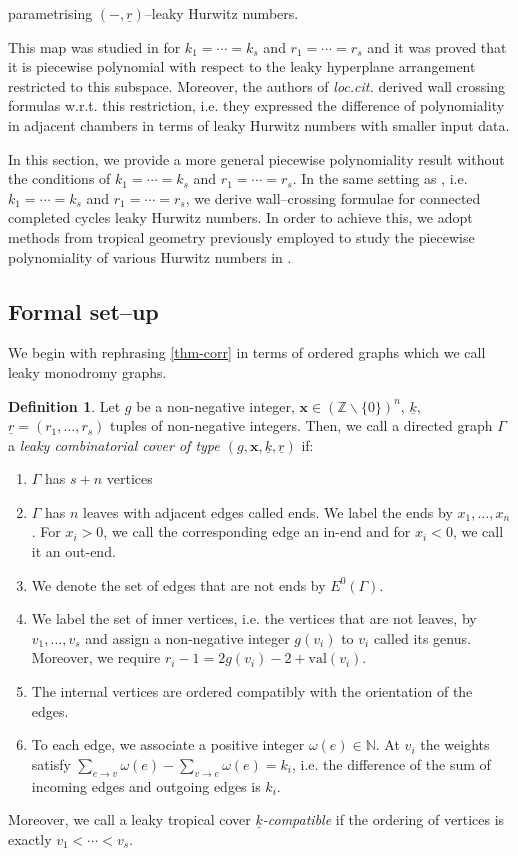 \documentclass[10pt,a4paper,oneside,no-math,reqno]{amsart}%
\theoremstyle{plain}
\theoremstyle{definition}
\newtheorem{definition}[theorem]{Definition}
\theoremstyle{remark}
\numberwithin{equation}{section}
\newcommand{\1}{\mathds{1}}
\newcommand{\<}{\langle}
\renewcommand{\>}{\rangle}
\begin{document}
parametrising $(-,\underline{r})$--leaky Hurwitz numbers.

This map was studied in \cite{AKL25} for $k_1=\cdots=k_s$ and $r_1=\cdots=r_s$ and it was proved that it is piecewise polynomial with respect to the leaky hyperplane arrangement restricted to this subspace. Moreover, the authors of \emph{loc.cit.} derived wall crossing formulas w.r.t. this restriction, i.e. they expressed the difference of polynomiality in adjacent chambers in terms of leaky Hurwitz numbers with smaller input data. 

In this section, we provide a more general piecewise polynomiality result without the conditions of $k_1=\cdots=k_s$ and $r_1=\cdots=r_s$. In the same setting as \cite{AKL25}, i.e. $k_1=\cdots=k_s$ and $r_1=\cdots=r_s$, we derive wall--crossing formulae for connected completed cycles leaky Hurwitz numbers.
In order to achieve this, we adopt methods from tropical geometry previously employed to study the piecewise polynomiality of various Hurwitz numbers in \cite{CJM11,HL20}.

\subsection{Formal set--up}
We begin with rephrasing \cref{thm-corr} in terms of ordered graphs which we call leaky monodromy graphs.

\begin{definition}
    Let $g$ be a non-negative integer, $\textbf{x}\in(\mathbb{Z}\backslash\{0\})^n$, $\underline{k}$, $\underline{r}=(r_1,\dots,r_s)$ tuples of non-negative integers. Then, we call a directed graph $\Gamma$ a \emph{leaky combinatorial cover of type $(g,\textbf{x},\underline{k},\underline{r})$} if:
    \begin{enumerate}
        \item $\Gamma$ has $s+n$ vertices
        \item $\Gamma$ has $n$ leaves with adjacent edges called ends. We label the ends by $x_1,\dots,x_n$. For $x_i>0$, we call the corresponding edge an in-end and for $x_i<0$, we call it an out-end.
        \item We denote the set of edges that are not ends by $E^0(\Gamma)$.
        \item We label the set of inner vertices, i.e. the vertices that are not leaves, by $v_1,\dots,v_s$ and assign a non-negative integer $g(v_i)$ to $v_i$ called its genus. Moreover, we require $r_i-1=2g(v_i)-2+\mathrm{val}(v_i)$.
        \item The internal vertices are ordered compatibly with the orientation of the edges.
        \item To each edge, we associate a positive integer $\omega(e)\in\mathbb{N}$. At $v_i$ the weights satisfy $\sum_{e\to v} \omega(e)-\sum_{v\to e}\omega(e)=k_i$, i.e. the difference of the sum of incoming edges and outgoing edges is $k_i$.
    \end{enumerate}
    Moreover, we call a leaky tropical cover \emph{$\underline{k}$-compatible} if the ordering of vertices is exactly $v_1<\cdots<v_s$.
\end{definition}
\end{document}
